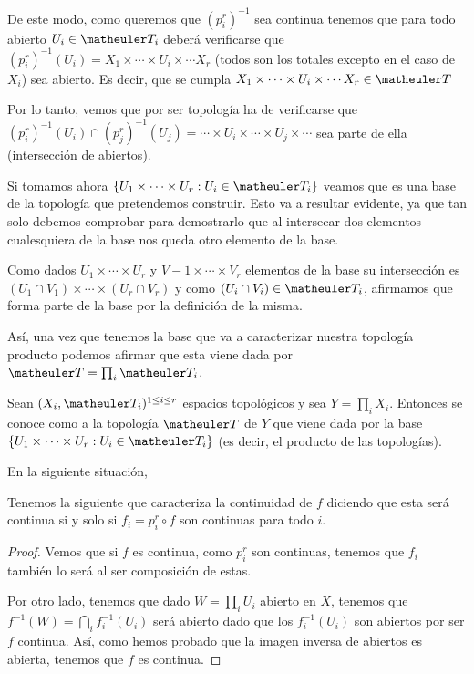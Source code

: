 De este modo, como queremos que $(p_i^r)^{-1}$ sea continua  tenemos que para todo abierto $U_i\in \T_i$ deberá verificarse que $(p_i^r)^{-1}(U_i)=X_1\times\cdots\times U_i\times\cdots X_r$ (todos son los totales excepto en el caso de $X_i$) sea abierto. Es decir, que se cumpla $X_1\times\cdots\times U_i \times\cdots X_r\in \T$

Por lo tanto, vemos que por ser topología ha de verificarse que $(p_i^r)^{-1}(U_i)\cap (p_j^r)^{-1}(U_j)= \cdots\times U_i \times\cdots\times U_j\times \cdots$ sea parte de ella (intersección de abiertos).

Si tomamos ahora $ \{ U_1\times\cdots\times U_r : U_i\in \T_i \}$ veamos que es una base de la topología que pretendemos construir. Esto va a resultar evidente, ya que tan solo debemos comprobar para demostrarlo que al intersecar dos elementos cualesquiera de la base nos queda otro elemento de la base. 

Como dados $U_1\times\cdots\times U_r$ y $V-1\times\cdots\times V_r$ elementos de la base su intersección es $(U_1\cap V_1)\times\cdots\times (U_r\cap V_r)$ y como $(U_i\cap V_i)\in \T_i$, afirmamos que forma parte de la base por la definición de la misma.

Así, una vez que tenemos la base que va a caracterizar nuestra topología producto podemos afirmar que esta viene dada por $\T=\prod_i \T_i$.

\begin{defi}
	Sean $(X_{i },\T_{i})^{1\le i\le r}$ espacios topológicos y sea $Y=\prod_i X_i$. Entonces se conoce como  a la topología $\T$ de $Y$ que viene dada por la base $ \{ U_1\times\cdots\times U_r : U_i\in \T_i \}$ (es decir, el producto de las topologías).
\end{defi}
\begin{lem}
	En la siguiente situación,%
	
	Tenemos la siguiente  que caracteriza la continuidad de $f$ diciendo que esta será continua si y solo si  $f_i=p_i^r\circ f$ son continuas para todo $i$.
	
	\begin{proof}
		Vemos que si $f$ es continua, como $p_i^r$ son continuas, tenemos que $f_i$ también lo será al ser composición de estas.
		
		Por otro lado, tenemos que dado $W=\prod_iU_i$ abierto en $X$, tenemos que $f^{-1}(W)=\bigcap_i f_i^{-1}(U_i)$ será abierto dado que los $f_i^{-1}(U_i)$ son abiertos por ser $f$ continua. Así, como hemos probado que la imagen inversa de abiertos es abierta, tenemos que $f$ es continua.
	\end{proof}
\end{lem}

